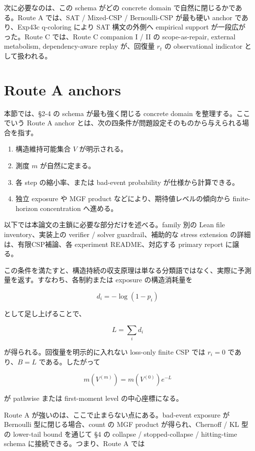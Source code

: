 \documentclass[12pt,a4paper]{article}
\begin{document}
次に必要なのは、この schema がどの concrete domain で自然に閉じるかである。Route A では、SAT / Mixed-CSP / Bernoulli-CSP が最も硬い anchor であり、Exp43c q-coloring により SAT 構文の外側へ empirical support が一段広がった。Route C では、Route C companion I / II の scope-as-repair, external metabolism, dependency-aware replay が、回復量 \(r_{t}\) の observational indicator として扱われる。

\section{Route A anchors}\label{route-a-anchors}

本節では、§2-4 の schema が最も強く閉じる concrete domain を整理する。ここでいう Route A anchor とは、次の四条件が問題設定そのものから与えられる場合を指す。

\begin{enumerate}
\def\labelenumi{\arabic{enumi}.}
\tightlist
\item
  構造維持可能集合 \(V\) が明示される。
\item
  測度 \(m\) が自然に定まる。
\item
  各 step の縮小率、または bad-event probability が仕様から計算できる。
\item
  独立 exposure や MGF product などにより、期待値レベルの傾向から finite-horizon concentration へ進める。
\end{enumerate}

以下では本論文の主鎖に必要な部分だけを述べる。family 別の Lean file inventory、実装上の verifier / solver guardrail、補助的な stress extension の詳細は、有限CSP補論、各 experiment README、対応する primary report に譲る。

この条件を満たすと、構造持続の収支原理は単なる分類語ではなく、実際に予測量を返す。すなわち、各制約または exposure の構造消耗量を

\[
d_{i} = -\log(1-p_{i})
\]

として足し上げることで、

\[
L = \sum_{i} d_{i}
\]

が得られる。回復量を明示的に入れない loss-only finite CSP では \(r_{i}=0\) であり、\(B=L\) である。したがって

\[
m(V^{(m)}) = m(V^{(0)})e^{-L}
\]

が pathwise または first-moment level の中心座標になる。

Route A が強いのは、ここで止まらない点にある。bad-event exposure が Bernoulli 型に閉じる場合、count の MGF product が得られ、Chernoff / KL 型の lower-tail bound を通じて §4 の collapse / stopped-collapse / hitting-time schema に接続できる。つまり、Route A では
\end{document}
